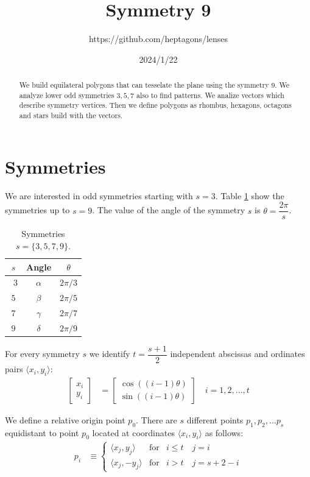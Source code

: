 \documentclass[11pt]{article}
\title{Symmetry 9}
\author{https://github.com/heptagons/lenses}
\date{2024/1/22}
\begin{document}
\maketitle
\begin{abstract}
We build equilateral polygons that can tesselate the plane using the symmetry $9$. We analyze lower odd symmetries $3,5,7$ also to find patterns. We analize vectors which describe symmetry vertices. Then we define polygons as rhombus, hexagons, octagons and stars build with the vectors.
\end{abstract}

\section{Symmetries}

We are interested in odd symmetries starting with $s=3$. Table \ref{tbl:symm} show the symmetries up to $s=9$. The value of the angle of the symmetry $s$ is $\theta = \dfrac{2\pi}s$. 

\begin{table}[H]
\begin{center}
\begin{tabular}{|c|c c|}
\hline
$s$ & Angle & $\theta$ \\ \hline\
$3$ & $\alpha$ & $2\pi/3$ \\ \hline
$5$ & $\beta$  & $2\pi/5$ \\ \hline
$7$ & $\gamma$ & $2\pi/7$ \\ \hline
$9$ & $\delta$ & $2\pi/9$ \\ \hline
\end{tabular}
\caption{Symmetries $s=\{3,5,7,9\}$.} 
\label{tbl:symm}
\end{center}
\end{table}

For every symmetry $s$ we identify $t = \dfrac{s+1}2$ independent abscissas and ordinates pairs $\langle x_i, y_i \rangle$:
\begin{align}
\left[ \begin{array}{c} x_i \\ y_i \end{array} \right] &= 
\left[ \begin{array}{c} \cos((i-1)\theta) \\ \sin((i-1)\theta) \end{array} \right]
 \quad i = 1,2,...,t \label{eq:pairs}
\end{align}

We define a relative origin point $p_0$. There are $s$ different points $p_1, p_2, ... p_s$  equidistant to point $p_0$ located at coordinates $\langle x_i,y_i \rangle$ as follows:
\begin{align}
p_i &\equiv \left\{ \begin{array}{ccl}
 \langle x_j,y_j\rangle & \mbox{for} & i \leq t  \quad j = i\\
 \langle x_j, -y_j\rangle & \mbox{for} & i > t \quad j = s+2-i
 \end{array}\right. \label{eq:coords}
\end{align}
\end{document}
